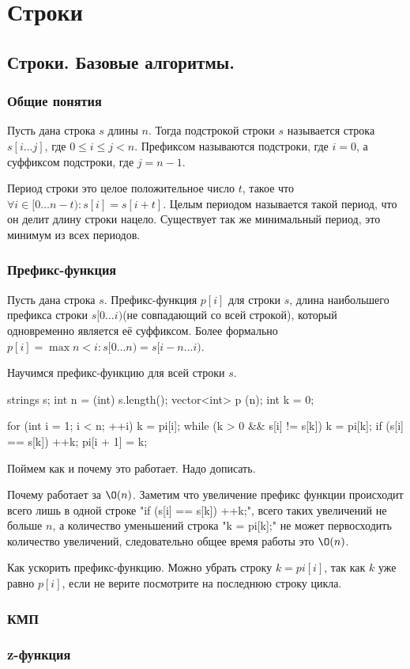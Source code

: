 \chapter{Строки}
\section{Строки. Базовые алгоритмы.}

\subsection{Общие понятия}

Пусть дана строка $s$ длины $n$. 
Тогда подстрокой строки $s$ называется строка $s[i \dots j]$, где $0 \le i \le j < n$.
Префиксом называются подстроки, где $i = 0$, а суффиксом подстроки, где $j = n - 1$.

Период строки это целое положительное число $t$, такое что $\forall i \in [0 \dots n-t) \colon s[i] = s[i + t]$.
Целым периодом называется такой период, что он делит длину строки нацело. 
Существует так же минимальный период, это минимум из всех периодов.

\subsection{Префикс-функция}
Пусть дана строка $s$. 
Префикс-функция $p[i]$ для строки $s$, длина наибольшего префикса строки $s[0 \dots i)$(не совпадающий со всей строкой), который одновременно является её суффиксом.
Более формально $p[i] = \max n < i \colon s[0 \dots n) = s[i - n \dots i)$.

Научимся префикс-функцию для всей строки $s$.

\begin{cppcode}
strings s;
int n = (int) s.length();
vector<int> p (n);
int k = 0;

for (int i = 1; i < n; ++i) {
  k = pi[i];
  while (k > 0 && s[i] != s[k])
    k = pi[k];
  if (s[i] == s[k]) ++k;
  pi[i + 1] = k;
}
\end{cppcode}

Поймем как и почему это работает. 
Надо дописать.

Почему работает за $\O(n)$.
Заметим что увеличение префикс функции происходит всего лишь в одной строке \cpp"if (s[i] == s[k]) ++k;", всего таких увеличений не больше $n$, а количество уменьшений строка \cpp"k = pi[k];" не может первосходить количество увеличений, следовательно общее время работы это $\O(n)$.

Как ускорить префикс-функцию.
Можно убрать строку $k = pi[i]$, так как $k$ уже равно $p[i]$, если не верите посмотрите на последнюю строку цикла.

\subsection{КМП}
\subsection{z-функция}